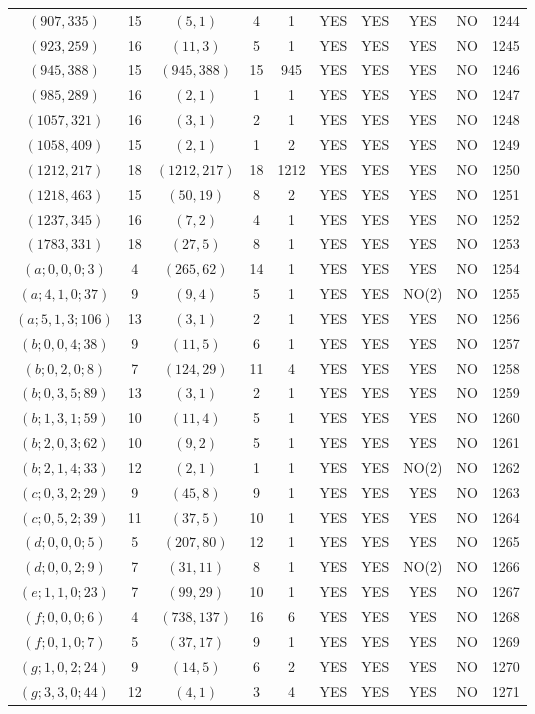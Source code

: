 \begin{longtable}{|c|c|c|c|c|c|c|c|c|c|}
$(907, 335)$ & 15 & $(5, 1)$ & 4 & 1 & YES & YES & YES & NO & 1244\\
$(923, 259)$ & 16 & $(11, 3)$ & 5 & 1 & YES & YES & YES & NO & 1245\\
$(945, 388)$ & 15 & $(945, 388)$ & 15 & 945 & YES & YES & YES & NO & 1246\\
$(985, 289)$ & 16 & $(2, 1)$ & 1 & 1 & YES & YES & YES & NO & 1247\\
$(1057, 321)$ & 16 & $(3, 1)$ & 2 & 1 & YES & YES & YES & NO & 1248\\
$(1058, 409)$ & 15 & $(2, 1)$ & 1 & 2 & YES & YES & YES & NO & 1249\\
$(1212, 217)$ & 18 & $(1212, 217)$ & 18 & 1212 & YES & YES & YES & NO & 1250\\
$(1218, 463)$ & 15 & $(50, 19)$ & 8 & 2 & YES & YES & YES & NO & 1251\\
$(1237, 345)$ & 16 & $(7, 2)$ & 4 & 1 & YES & YES & YES & NO & 1252\\
$(1783, 331)$ & 18 & $(27, 5)$ & 8 & 1 & YES & YES & YES & NO & 1253\\
$(a; 0, 0, 0; 3)$ & 4 & $(265, 62)$ & 14 & 1 & YES & YES & YES & NO & 1254\\
$(a; 4, 1, 0; 37)$ & 9 & $(9, 4)$ & 5 & 1 & YES & YES & NO(2) & NO & 1255\\
$(a; 5, 1, 3; 106)$ & 13 & $(3, 1)$ & 2 & 1 & YES & YES & YES & NO & 1256\\
$(b; 0, 0, 4; 38)$ & 9 & $(11, 5)$ & 6 & 1 & YES & YES & YES & NO & 1257\\
$(b; 0, 2, 0; 8)$ & 7 & $(124, 29)$ & 11 & 4 & YES & YES & YES & NO & 1258\\
$(b; 0, 3, 5; 89)$ & 13 & $(3, 1)$ & 2 & 1 & YES & YES & YES & NO & 1259\\
$(b; 1, 3, 1; 59)$ & 10 & $(11, 4)$ & 5 & 1 & YES & YES & YES & NO & 1260\\
$(b; 2, 0, 3; 62)$ & 10 & $(9, 2)$ & 5 & 1 & YES & YES & YES & NO & 1261\\
$(b; 2, 1, 4; 33)$ & 12 & $(2, 1)$ & 1 & 1 & YES & YES & NO(2) & NO & 1262\\
$(c; 0, 3, 2; 29)$ & 9 & $(45, 8)$ & 9 & 1 & YES & YES & YES & NO & 1263\\
$(c; 0, 5, 2; 39)$ & 11 & $(37, 5)$ & 10 & 1 & YES & YES & YES & NO & 1264\\
$(d; 0, 0, 0; 5)$ & 5 & $(207, 80)$ & 12 & 1 & YES & YES & YES & NO & 1265\\
$(d; 0, 0, 2; 9)$ & 7 & $(31, 11)$ & 8 & 1 & YES & YES & NO(2) & NO & 1266\\
$(e; 1, 1, 0; 23)$ & 7 & $(99, 29)$ & 10 & 1 & YES & YES & YES & NO & 1267\\
$(f; 0, 0, 0; 6)$ & 4 & $(738, 137)$ & 16 & 6 & YES & YES & YES & NO & 1268\\
$(f; 0, 1, 0; 7)$ & 5 & $(37, 17)$ & 9 & 1 & YES & YES & YES & NO & 1269\\
$(g; 1, 0, 2; 24)$ & 9 & $(14, 5)$ & 6 & 2 & YES & YES & YES & NO & 1270\\
$(g; 3, 3, 0; 44)$ & 12 & $(4, 1)$ & 3 & 4 & YES & YES & YES & NO & 1271
\end{longtable}
